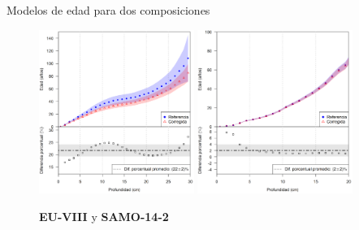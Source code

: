 \documentclass[9pt]{beamer}
\begin{document}
\begin{frame}{Modelos de edad para dos composiciones}
	\begin{figure}
		\centering
		\includegraphics[width=0.45\textwidth]{Imagenes/EUVIII_1.png}
				\includegraphics[width=0.45\textwidth]{Imagenes/SAMO142_1.png}

		\caption{ \textbf{EU-VIII} y \textbf{SAMO-14-2}}
	\end{figure}
\end{frame}
\end{document}
